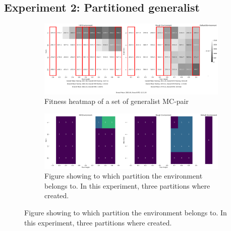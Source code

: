     \subsection{Experiment 2: Partitioned generalist}
        \begin{figure}[!htp]
            \centering
            \begin{subfigure}{\textwidth}
                \centering
                \includegraphics[width=\linewidth]{./resources/partition_5_2906_3/fitness_heatmap.png}
                \caption{Fitness heatmap of a set of generalist MC-pair}
                \label{fig:fit_heat_partitioned}
            \end{subfigure}

            \begin{subfigure}{\textwidth}
                \centering
                \includegraphics[width=\linewidth]{./resources/partition_5_2906_3/generalist_heatmap_partition.png}
                \caption{Figure showing to which partition the environment belongs to. In this experiment, three partitions where created.}
                \label{fig:heat_partition_number}
            \end{subfigure}


\end{figure}
